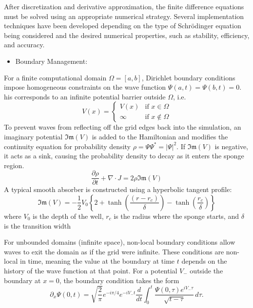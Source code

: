 \documentclass[11pt]{article}
\begin{document}
After discretization and derivative approximation, the finite difference equations must be solved using an appropriate numerical strategy. Several implementation techniques have been developed depending on the type of Schrödinger equation being considered and the desired numerical properties, such as stability, efficiency, and accuracy.

\begin{itemize}
	\item 
	Boundary Management:
\end{itemize}
For a finite computational domain $\Omega = [a,b]$, Dirichlet boundary conditions impose homogeneous constraints on the wave function $\Psi(a,t) = \Psi(b,t) = 0$. his corresponds to an infinite potential barrier outside $\Omega$, i.e.
\begin{equation}
	V(x) = 
	\begin{cases} 
		V(x) & \text{if } x \in \Omega \\
		\infty & \text{if } x \notin \Omega 
	\end{cases}
\end{equation}
To prevent waves from reflecting off the grid edges back into the simulation, an imaginary potential $\mathfrak{Im}(V)$ is added to the Hamiltonian and modifies the continuity equation for probability density $\rho = \Psi \Psi^* = |\Psi|^2$. If $\mathfrak{Im}(V)$ is negative, it acts as a sink, causing the probability density to decay as it enters the sponge region.
\begin{equation}
	\frac{\partial \rho}{\partial t} + \nabla \cdot J = 2 \rho \mathfrak{Im}(V)
\end{equation}
A typical smooth absorber is constructed using a hyperbolic tangent profile:
\begin{equation}
	\mathfrak{Im}(V) = - \frac{1}{2} V_0 \left\{ 2 + \tanh \left( \frac{(r - r_c)}{\delta}  \right) - \tanh (\frac{r_c}{\delta}) \right\}
\end{equation}
 where $V_0$ is the depth of the well, $r_c$ is the radius where the sponge starts, and $\delta$ is the transition width

For unbounded domains (infinite space), non-local boundary conditions allow waves to exit the domain as if the grid were infinite. These conditions are non-local in time, meaning the value at the boundary at time $t$ depends on the history of the wave function at that point. For a potential $V_-$ outside the boundary at $x=0$, the boundary condition takes the form
\begin{equation}
	\partial_x \Psi(0,t) = \sqrt{\frac{2}{\pi}} e^{-i\pi/4} e^{-iV_- t} \frac{d}{dt} \int_0^t \frac{\Psi(0,\tau)e^{iV_- \tau}}{\sqrt{t-\tau}}\, d\tau.
\end{equation}
\end{document}
